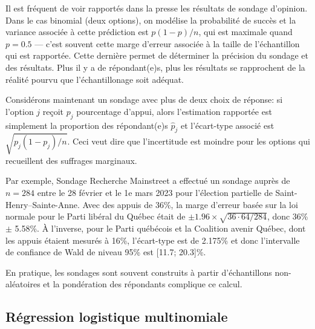 \documentclass[
  11pt,
  letterpaper,
]{scrbook}
\theoremstyle{definition}
\theoremstyle{remark}
\begin{document}
Il est fréquent de voir rapportés dans la presse les résultats de
sondage d'opinion. Dans le cas binomial (deux options), on modélise la
probabilité de succès et la variance associée à cette prédiction est
\(p(1-p)/n\), qui est maximale quand \(p=0.5\) --- c'est souvent cette
marge d'erreur associée à la taille de l'échantillon qui est rapportée.
Cette dernière permet de déterminer la précision du sondage et des
résultats. Plus il y a de répondant(e)s, plus les résultats se
rapprochent de la réalité pourvu que l'échantillonage soit adéquat.

Considérons maintenant un sondage avec plus de deux choix de réponse: si
l'option \(j\) reçoit \(p_j\) pourcentage d'appui, alors l'estimation
rapportée est simplement la proportion des répondant(e)s
\(\widehat{p}_j\) et l'écart-type associé est \(\sqrt{p_j(1-p_j)/n}\).
Ceci veut dire que l'incertitude est moindre pour les options qui
recueillent des suffrages marginaux.

Par exemple, Sondage Recherche Mainstreet a effectué un sondage auprès
de \(n=284\) entre le 28 février et le 1e mars 2023 pour l'élection
partielle de Saint-Henry--Sainte-Anne. Avec des appuis de 36\%, la marge
d'erreur basée sur la loi normale pour le Parti libéral du Québec était
de \(\pm 1.96 \times \sqrt{36 \cdot 64/284}\), donc 36\% \(\pm\) 5.58\%.
À l'inverse, pour le Parti québécois et la Coalition avenir Québec, dont
les appuis étaient mesurés à 16\%, l'écart-type est de 2.175\% et donc
l'intervalle de confiance de Wald de niveau 95\% est {[}11.7; 20.3{]}\%.

En pratique, les sondages sont souvent construits à partir
d'échantillons non-aléatoires et la pondération des répondants complique
ce calcul.

\subsection{Régression logistique
multinomiale}\label{ruxe9gression-logistique-multinomiale}
\end{document}
